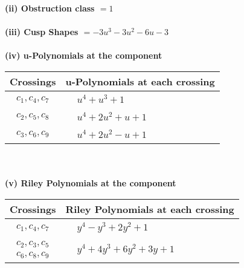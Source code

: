 \documentclass[1p]{elsarticle_modified}
\theoremstyle{definition}
\begin{document}
\flushleft \textbf{(ii) Obstruction class $= 1$}\\~\\
\flushleft \textbf{(iii) Cusp Shapes $= -3 u^3-3 u^2-6 u-3$}\\~\\
\newpage\renewcommand{\arraystretch}{1}
\flushleft \textbf{(iv) u-Polynomials at the component}\newline \\
\begin{tabular}{m{50pt}|m{274pt}}
Crossings & \hspace{64pt}u-Polynomials at each crossing \\
\hline $$\begin{aligned}c_{1},c_{4},c_{7}\end{aligned}$$&$\begin{aligned}
&u^4+u^3+1
\end{aligned}$\\
\hline $$\begin{aligned}c_{2},c_{5},c_{8}\end{aligned}$$&$\begin{aligned}
&u^4+2 u^2+u+1
\end{aligned}$\\
\hline $$\begin{aligned}c_{3},c_{6},c_{9}\end{aligned}$$&$\begin{aligned}
&u^4+2 u^2- u+1
\end{aligned}$\\
\hline
\end{tabular}\\~\\
\newpage\renewcommand{\arraystretch}{1}
\flushleft \textbf{(v) Riley Polynomials at the component}\newline \\
\begin{tabular}{m{50pt}|m{274pt}}
Crossings & \hspace{64pt}Riley Polynomials at each crossing \\
\hline $$\begin{aligned}c_{1},c_{4},c_{7}\end{aligned}$$&$\begin{aligned}
&y^4- y^3+2 y^2+1
\end{aligned}$\\
\hline $$\begin{aligned}c_{2},c_{3},c_{5}\\c_{6},c_{8},c_{9}\end{aligned}$$&$\begin{aligned}
&y^4+4 y^3+6 y^2+3 y+1
\end{aligned}$\\
\hline
\end{tabular}\\~\\
\end{document}
